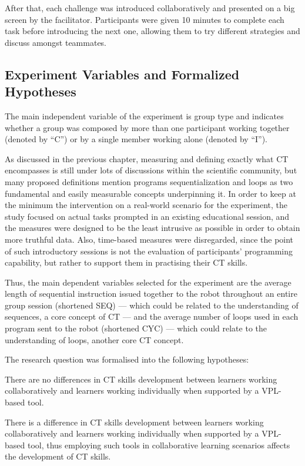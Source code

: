After that, each challenge was introduced collaboratively and presented on a big screen by the facilitator. Participants were given 10 minutes to complete each task before introducing the next one, allowing them to try different strategies and discuss amongst teammates.

\subsection{Experiment Variables and Formalized Hypotheses}
The main independent variable of the experiment is group type and indicates whether a group was composed by more than one participant working together (denoted by ``C'') or by a single member working alone (denoted by ``I'').

As discussed in the previous chapter, measuring and defining exactly what \ac{CT} encompasses is still under lots of discussions within the scientific community, but many proposed definitions mention programs sequentialization and loops as two fundamental and easily measurable concepts underpinning it. In order to keep at the minimum the intervention on a real-world scenario for the experiment, the study focused on actual tasks prompted in an existing educational session, and the measures were designed to be the least intrusive as possible in order to obtain more truthful data. Also, time-based measures were disregarded, since the point of such introductory sessions is not the evaluation of participants' programming capability, but rather to support them in practising their \ac{CT} skills.

Thus, the main dependent variables selected for the experiment are the average length of sequential instruction issued together to the robot throughout an entire group session (shortened SEQ) --- which could be related to the understanding of sequences, a core concept of \ac{CT} --- and the average number of loops used in each program sent to the robot (shortened CYC) --- which could relate to the understanding of loops, another core \ac{CT} concept.

The research question was formalised into the following hypotheses:
\setcounter{hyp}{-1}\begin{hyp}
  There are no differences in \ac{CT} skills development between learners working collaboratively and learners working individually when supported by a \ac{VPL}-based tool.
\end{hyp}
\begin{hyp}
  There is a difference in \ac{CT} skills development between learners working collaboratively and learners working individually when supported by a \ac{VPL}-based tool, thus employing such tools in collaborative learning scenarios affects the development of \ac{CT} skills.
\end{hyp}

